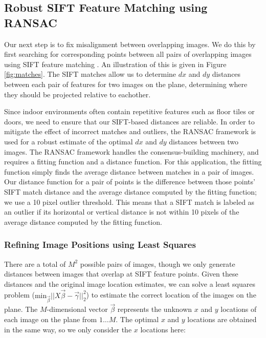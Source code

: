 \documentclass[10pt,twocolumn,letterpaper]{article}
\begin{document}
\subsection{Robust SIFT Feature Matching using RANSAC}
\label{sec:robustSIFTFeatureMatching}
Our next step is to fix misalignment between overlapping images. We do
this by first searching for corresponding points between all pairs of
overlapping images using SIFT feature matching
\cite{lowe1999object}. An illustration of this is given in Figure
\ref{fig:matches}. The SIFT matches allow us to determine $dx$ and
$dy$ distances between each pair of features for two images on the
plane, determining where they should be projected relative to
eachother.

Since indoor environments often contain repetitive features such as
floor tiles or doors, we need to ensure that our SIFT-based distances
are reliable. In order to mitigate the effect of incorrect matches and
outliers, the RANSAC framework \cite{fischler1981random} is used for a
robust estimate of the optimal $dx$ and $dy$ distances between two
images. The RANSAC framework handles the consensus-building machinery,
and requires a fitting function and a distance function. For this
application, the fitting function simply finds the average distance
between matches in a pair of images. Our distance function for a pair
of points is the difference between those points' SIFT match distance
and the average distance computed by the fitting function; we use a 10
pixel outlier threshold. This means that a SIFT match is labeled as an
outlier if its horizontal or vertical distance is not within 10 pixels
of the average distance computed by the fitting function.

\subsubsection{Refining Image Positions using Least Squares}
\label{sec:refiningImagePositions}
There are a total of $M^{2}$ possible pairs of images, though we only
generate distances between images that overlap at SIFT feature
points. Given these distances and the original image location
estimates, we can solve a least squares problem
($\textrm{min}_{\vec{\beta}} ||X \vec{\beta} - \vec{\gamma}||_2^2 $)
to estimate the correct location of the images on the plane. The
$M$-dimensional vector $\vec{\beta}$ represents the unknown $x$ and
$y$ locations of each image on the plane from $1 \dots M$. The optimal
$x$ and $y$ locations are obtained in the same way, so we only
consider the $x$ locations here:
\end{document}
